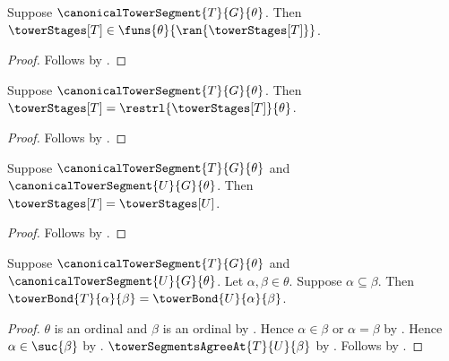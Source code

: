 \begin{proposition}\label{canonical_tower_stage_family_type}
    Suppose $\canonicalTowerSegment{T}{G}{\theta}$.
    Then $\towerStages[T]\in
        \funs{\theta}{\ran{\towerStages[T]}}$.
\end{proposition}
\begin{proof}
    Follows by
        .
\end{proof}

\begin{proposition}\label{canonical_tower_stage_full_restriction}
    Suppose $\canonicalTowerSegment{T}{G}{\theta}$.
    Then $\towerStages[T]=\restrl{\towerStages[T]}{\theta}$.
\end{proposition}
\begin{proof}
    Follows by
        .
\end{proof}

\begin{theorem}\label{canonical_tower_stage_families_equal}
    Suppose $\canonicalTowerSegment{T}{G}{\theta}$ and
        $\canonicalTowerSegment{U}{G}{\theta}$.
    Then $\towerStages[T]=\towerStages[U]$.
\end{theorem}
\begin{proof}
    Follows by
        .
\end{proof}

\begin{proposition}\label{canonical_tower_bond_value_agreement}
    Suppose $\canonicalTowerSegment{T}{G}{\theta}$ and
        $\canonicalTowerSegment{U}{G}{\theta}$.
    Let $\alpha,\beta\in\theta$.
    Suppose $\alpha\subseteq\beta$.
    Then $\towerBond{T}{\alpha}{\beta}=
        \towerBond{U}{\alpha}{\beta}$.
\end{proposition}
\begin{proof}
    $\theta$ is an ordinal and $\beta$ is an ordinal by
        .
    Hence $\alpha\in\beta$ or $\alpha=\beta$ by
        .
    Hence $\alpha\in\suc{\beta}$ by .
    $\towerSegmentsAgreeAt{T}{U}{\beta}$ by
        .
    Follows by .
\end{proof}

